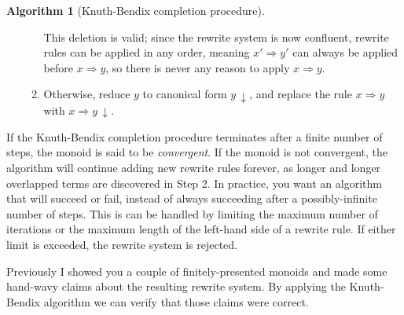 \documentclass[a4paper,headsepline,bibliography=totoc,toc=flat,fleqn,twoside=semi]{scrbook}
\theoremstyle{definition}
\theoremstyle{definition}
\theoremstyle{definition}
\newtheorem{algorithm}{Algorithm}[chapter]
\begin{document}
\begin{algorithm}[Knuth-Bendix completion procedure]
\begin{enumerate}
\begin{enumerate}
This deletion is valid; since the rewrite system is now confluent, rewrite rules can be applied in any order, meaning $x'\Rightarrow y'$ can always be applied before $x\Rightarrow y$, so there is never any reason to apply $x\Rightarrow y$. 
\item Otherwise, reduce $y$ to canonical form ${y}\,{\downarrow}$, and replace the rule $x\Rightarrow y$ with $x\Rightarrow {y}\,{\downarrow}$.
\end{enumerate}
\end{enumerate}
\end{algorithm}
\begin{figure}\label{criticalfig}
\begin{center}
\end{center}
\end{figure}
If the Knuth-Bendix completion procedure terminates after a finite number of steps, the monoid is said to be \emph{convergent}. If the monoid is not convergent, the algorithm will continue adding new rewrite rules forever, as longer and longer overlapped terms are discovered in Step 2. In practice, you want an algorithm that will succeed or fail, instead of always succeeding after a possibly-infinite number of steps. This is can be handled by limiting the maximum number of iterations or the maximum length of the left-hand side of a rewrite rule. If either limit is exceeded, the rewrite system is rejected.

Previously I showed you a couple of finitely-presented monoids and made some hand-wavy claims about the resulting rewrite system. By applying the Knuth-Bendix algorithm we can verify that those claims were correct.
\end{document}
